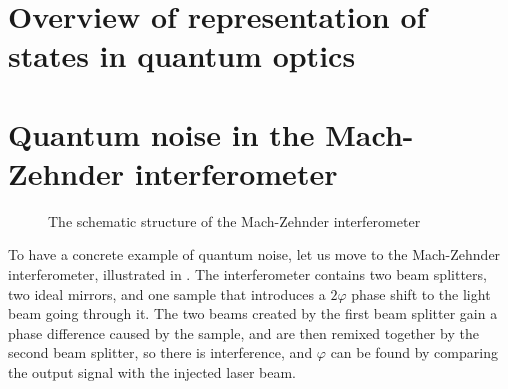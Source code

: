 \documentclass[hyperref, a4paper]{article}
\begin{document}
\section{Overview of representation of states in quantum optics}\label{sec:overview-rep}



\section{Quantum noise in the Mach-Zehnder interferometer}\label{sec:interferometer}

\begin{figure}
    \centering
    
    \caption{The schematic structure of the Mach-Zehnder interferometer}
    \label{fig:mz-inter}
\end{figure}

To have a concrete example of quantum noise, 
let us move to the Mach-Zehnder interferometer,
illustrated in .
The interferometer contains two beam splitters, 
two ideal mirrors, 
and one sample that introduces a $2\varphi$ phase shift to the light beam going through it.
The two beams created by the first beam splitter gain a phase difference caused by the sample,
and are then remixed together by the second beam splitter,
so there is interference,
and $\varphi$ can be found by comparing the output signal with the injected laser beam.
\end{document}
